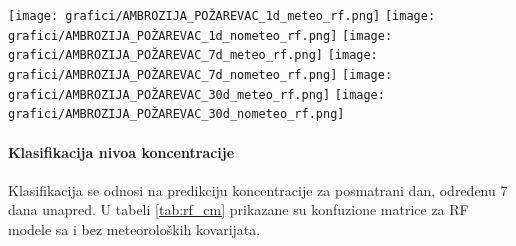 \documentclass[12pt]{article}
\begin{document}
\begin{center}
    \texttt{[image: grafici/AMBROZIJA\_POŽAREVAC\_1d\_meteo\_rf.png]}
    \vspace{0.3cm}
    \texttt{[image: grafici/AMBROZIJA\_POŽAREVAC\_1d\_nometeo\_rf.png]}
    \vspace{0.3cm}
    \texttt{[image: grafici/AMBROZIJA\_POŽAREVAC\_7d\_meteo\_rf.png]}
    \vspace{0.3cm}
    \texttt{[image: grafici/AMBROZIJA\_POŽAREVAC\_7d\_nometeo\_rf.png]}
    \vspace{0.3cm}
    \texttt{[image: grafici/AMBROZIJA\_POŽAREVAC\_30d\_meteo\_rf.png]}
    \vspace{0.3cm}
    \texttt{[image: grafici/AMBROZIJA\_POŽAREVAC\_30d\_nometeo\_rf.png]}
    \label{fig:rf_forecast_6x1}
\end{center}




\paragraph{\textbf{Klasifikacija nivoa koncentracije}}  
Klasifikacija se odnosi na predikciju koncentracije za posmatrani dan, određenu 7 dana unapred.  
U tabeli \ref{tab:rf_cm} prikazane su konfuzione matrice za RF modele sa i bez meteoroloških kovarijata.
\end{document}

